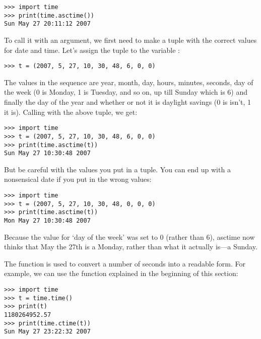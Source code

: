 \begin{listingignore}
\begin{verbatim}
>>> import time
>>> print(time.asctime())
Sun May 27 20:11:12 2007
\end{verbatim}
\end{listingignore}

\noindent
To call it with an argument, we first need to make a tuple with the correct values for date and time.  Let's assign the tuple to the variable :

\begin{listing}
\begin{verbatim}
>>> t = (2007, 5, 27, 10, 30, 48, 6, 0, 0)
\end{verbatim}
\end{listing}

\noindent
The values in the sequence are year, month, day, hours, minutes, seconds, day of the week (0 is Monday, 1 is Tuesday, and so on, up till Sunday which is 6) and finally the day of the year and whether or not it is daylight savings (0 is isn't, 1 it is). Calling  with the above tuple, we get:

\begin{listing}
\begin{verbatim}
>>> import time
>>> t = (2007, 5, 27, 10, 30, 48, 6, 0, 0)
>>> print(time.asctime(t))
Sun May 27 10:30:48 2007
\end{verbatim}
\end{listing}

\noindent
But be careful with the values you put in a tuple. You can end up with a nonsensical date if you put in the wrong values:

\begin{listing}
\begin{verbatim}
>>> import time
>>> t = (2007, 5, 27, 10, 30, 48, 0, 0, 0)
>>> print(time.asctime(t))
Mon May 27 10:30:48 2007
\end{verbatim}
\end{listing}

\noindent
Because the value for `day of the week' was set to 0 (rather than 6), asctime now thinks that May the 27th is a Monday, rather than what it actually is---a Sunday.

The function  is used to convert a number of seconds into a readable form.  For example, we can use the  function explained in the beginning of this section:

\begin{listingignore}
\begin{verbatim}
>>> import time
>>> t = time.time()
>>> print(t)
1180264952.57
>>> print(time.ctime(t))
Sun May 27 23:22:32 2007
\end{verbatim}
\end{listingignore}

